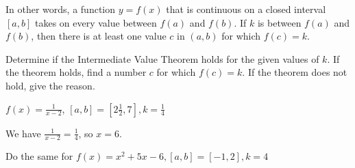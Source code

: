 \documentclass[../bccalc.tex]{subfiles}
\begin{document}
In other words, a function $y=f(x)$ that is continuous on a closed interval $[a,b]$ takes on every value between $f(a)$ and $f(b)$. If $k$ is between $f(a)$ and $f(b)$, then there is at least one value $c$ in $(a,b)$ for which $f(c)=k$.

\begin{example}
    Determine if the Intermediate Value Theorem holds for the given values of $k$. If the theorem holds, find a number $c$ for which $f(c)=k$. If the theorem does not hold, give the reason.

    $f(x) = \frac{1}{x-2}$, $[a,b]=\left[2\frac{1}{2},7\right], k=\frac{1}{4}$

    We have $\frac{1}{x-2}=\frac{1}{4}$, so $x=6$.
\end{example}

\ex Do the same for $f(x)=x^2+5x-6, [a,b]=[-1,2], k=4$
\end{document}
